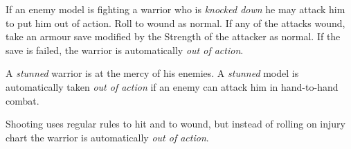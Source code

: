 {\small If an enemy model is fighting a warrior who is
\textit{knocked down} he may attack him to put him out of
action. Roll to wound as normal. If any of the
attacks wound, take an armour save modified by the
Strength of the attacker as normal. If the save is
failed, the warrior is automatically \textit{out of action}.

A \textit{stunned} warrior is at the mercy of his enemies. A
\textit{stunned} model is automatically taken \textit{out of action} if
an enemy can attack him in hand-to-hand combat.

Shooting uses regular rules to hit and to wound, but instead of rolling on injury chart the warrior is automatically \textit{out of action}.}